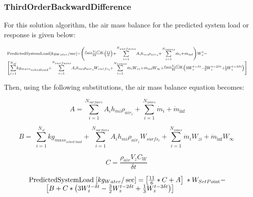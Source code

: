 \subsubsection{ThirdOrderBackwardDifference}\label{thirdorderbackwarddifference-001}

For this solution algorithm, the air mass balance for the predicted system load or response is given below:

\begin{equation}
\medmuskip=0mu
\thinmuskip=0mu
\thickmuskip=0mu
\nulldelimiterspace=0pt
\scriptspace=0pt
\scriptsize{\begin{array}{l}{\rm{PredictedSystemLoad}}\;[k{g_{Water}}/\sec ] = \left( {\frac{{{\rho_{air}}{V_z}{C_W}}}{{\delta t}}\left( {\frac{{11}}{6}} \right) + \sum\limits_{i = 1}^{{N_{surfaces}}} {{A_i}{h_{mi}}} {\rho_{ai{r_z}}} + \sum\limits_{i = 1}^{{N_{zones}}} {{{\dot m}_i}}  + {{\dot m}_{\inf }}} \right)W_z^t - \\\;\;\;\left[ {\sum\limits_{i = 1}^{{N_{sl}}} {k{g_{mas{s_{sched\;load}}}}}  + \sum\limits_{i = 1}^{{N_{surfaces}}} {{A_i}{h_{mi}}} {\rho_{ai{r_z}}}{W_{surf{s_i}}} + \sum\limits_{i = 1}^{{N_{zones}}} {{{\dot m}_i}} {W_{zi}} + {{\dot m}_{\inf }}{W_\infty } + \frac{{{\rho_{air}}{V_z}{C_W}}}{{\delta t}}\left( {3W_z^{t - \delta t} - \frac{3}{2}W_z^{t - 2\delta t} + \frac{1}{3}W_z^{t - 3\delta t}} \right)} \right]\;\;\end{array}}
\end{equation}

Then, using the following substitutions, the air mass balance equation becomes:

\begin{equation}
A = \sum\limits_{i = 1}^{{N_{surfaces}}} {{A_i}{h_{mi}}} {\rho_{ai{r_z}}} + \sum\limits_{i = 1}^{{N_{zones}}} {{{\dot m}_i}}  + {\dot m_{\inf }}
\end{equation}

\begin{equation}
B = \;\sum\limits_{i = 1}^{{N_{sl}}} {k{g_{mas{s_{sched\;load}}}}}  + \sum\limits_{i = 1}^{{N_{surfaces}}} {{A_i}{h_{mi}}} {\rho_{ai{r_z}}}{W_{surf{s_i}}} + \sum\limits_{i = 1}^{{N_{zones}}} {{{\dot m}_i}} {W_{zi}} + {\dot m_{\inf }}{W_\infty }\;
\end{equation}

\begin{equation}
C = \frac{{{\rho_{air}}{V_z}{C_W}}}{{\delta t}}\;
\end{equation}

\begin{equation}
\begin{array}{l}{\rm{PredictedSystemLoad}}\;[k{g_{Water}}/\sec ] = \left[ {\frac{{11}}{6}*C + A} \right]\;*{W_{SetPo{\mathop{\rm int}} }} - \\\;\;\;\;\;\;\;\;\;\left[ {B + C*\left( {3W_z^{t - \delta t} - \frac{3}{2}W_z^{t - 2\delta t} + \frac{1}{3}W_z^{t - 3\delta t}} \right)} \right]\end{array}
\end{equation}

